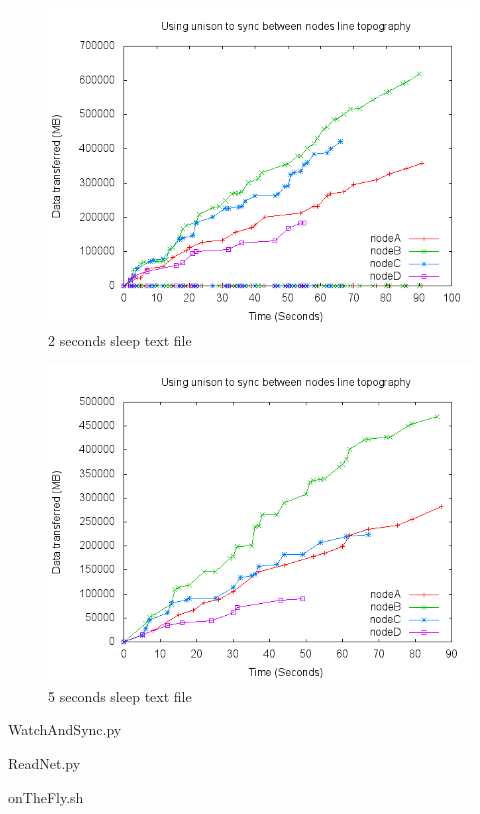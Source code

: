 \documentclass[12pt]{article}
\begin{document}
\begin{figure}[htp]
    \centering
    \includegraphics[scale=0.5]{images/rand-txt-2sleep.png}
    \caption{2 seconds sleep text file}
    \label{fig:2sleep_graph}
\end{figure}

\begin{figure}[htp]
    \centering
    \includegraphics[scale=0.5]{images/5sleep-bad.png}
    \caption{5 seconds sleep text file}
    \label{fig:5sleep_graph}
\end{figure}

\newpage
WatchAndSync.py


\newpage
ReadNet.py


\newpage
onTheFly.sh

\end{document}
